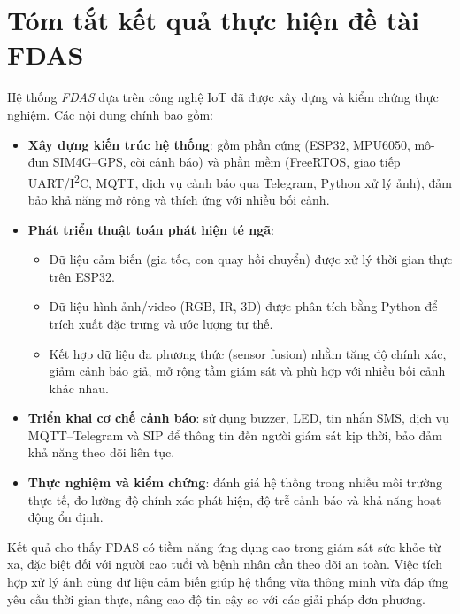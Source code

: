 \section{Tóm tắt kết quả thực hiện đề tài FDAS}
\label{sec:summary}

Hệ thống \textit{FDAS} dựa trên công nghệ IoT đã được xây dựng và kiểm chứng thực nghiệm. 
Các nội dung chính bao gồm:  

\begin{itemize}
    \item \textbf{Xây dựng kiến trúc hệ thống}: gồm phần cứng (ESP32, MPU6050, mô-đun SIM4G--GPS, còi cảnh báo) và phần mềm (FreeRTOS, giao tiếp UART/I\textsuperscript{2}C, MQTT, dịch vụ cảnh báo qua Telegram, Python xử lý ảnh), đảm bảo khả năng mở rộng và thích ứng với nhiều bối cảnh.
    
    \item \textbf{Phát triển thuật toán phát hiện té ngã}: 
    \begin{itemize}
        \item Dữ liệu cảm biến (gia tốc, con quay hồi chuyển) được xử lý thời gian thực trên ESP32.
        \item Dữ liệu hình ảnh/video (RGB, IR, 3D) được phân tích bằng Python để trích xuất đặc trưng và ước lượng tư thế.
        \item Kết hợp dữ liệu đa phương thức (sensor fusion) nhằm tăng độ chính xác, giảm cảnh báo giả, mở rộng tầm giám sát và phù hợp với nhiều bối cảnh khác nhau.
    \end{itemize}
    
    \item \textbf{Triển khai cơ chế cảnh báo}: sử dụng buzzer, LED, tin nhắn SMS, dịch vụ MQTT--Telegram và SIP để thông tin đến người giám sát kịp thời, bảo đảm khả năng theo dõi liên tục.
    
    \item \textbf{Thực nghiệm và kiểm chứng}: đánh giá hệ thống trong nhiều môi trường thực tế, đo lường độ chính xác phát hiện, độ trễ cảnh báo và khả năng hoạt động ổn định.
\end{itemize}

Kết quả cho thấy FDAS có tiềm năng ứng dụng cao trong giám sát sức khỏe từ xa, đặc biệt đối với người cao tuổi và bệnh nhân cần theo dõi an toàn. 
Việc tích hợp xử lý ảnh cùng dữ liệu cảm biến giúp hệ thống vừa thông minh vừa đáp ứng yêu cầu thời gian thực, nâng cao độ tin cậy so với các giải pháp đơn phương.
